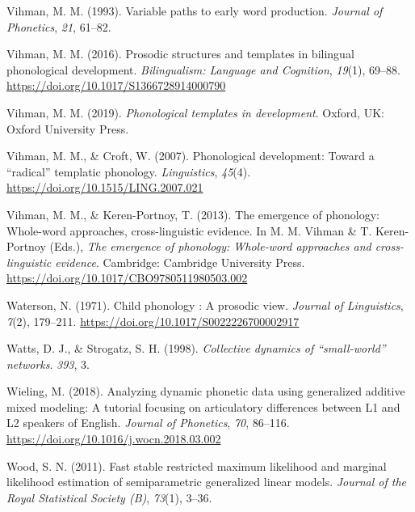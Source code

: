 \documentclass[
  man]{apa6}
\newlength{\cslhangindent}
\newenvironment{CSLReferences}[2] %
 {\begin{list}{}{%
  \setlength{\itemindent}{0pt}
  \setlength{\leftmargin}{0pt}
  \setlength{\parsep}{0pt}
  \ifodd #1
   \setlength{\leftmargin}{\cslhangindent}
   \setlength{\itemindent}{-1\cslhangindent}
  \fi
  \setlength{\itemsep}{#2\baselineskip}}}
 {\end{list}}
\begin{document}
\begin{CSLReferences}{1}{0}
Vihman, M. M. (1993). Variable paths to early word production. \emph{Journal of Phonetics}, \emph{21}, 61--82.

Vihman, M. M. (2016). Prosodic structures and templates in bilingual phonological development. \emph{Bilingualism: Language and Cognition}, \emph{19}(1), 69--88. \url{https://doi.org/10.1017/S1366728914000790}

Vihman, M. M. (2019). \emph{Phonological templates in development}. Oxford, {UK}: Oxford University Press.

Vihman, M. M., \& Croft, W. (2007). Phonological development: Toward a {``radical''} templatic phonology. \emph{Linguistics}, \emph{45}(4). \url{https://doi.org/10.1515/LING.2007.021}

Vihman, M. M., \& Keren-Portnoy, T. (2013). The emergence of phonology: Whole-word approaches, cross-linguistic evidence. In M. M. Vihman \& T. Keren-Portnoy (Eds.), \emph{The emergence of phonology: Whole-word approaches and cross-linguistic evidence}. Cambridge: Cambridge University Press. \url{https://doi.org/10.1017/CBO9780511980503.002}

Waterson, N. (1971). Child phonology : A prosodic view. \emph{Journal of Linguistics}, \emph{7}(2), 179--211. \url{https://doi.org/10.1017/S0022226700002917}

Watts, D. J., \& Strogatz, S. H. (1998). \emph{Collective dynamics of {``small-world''} networks}. \emph{393}, 3.

Wieling, M. (2018). Analyzing dynamic phonetic data using generalized additive mixed modeling: {A} tutorial focusing on articulatory differences between {L1} and {L2} speakers of {English}. \emph{Journal of Phonetics}, \emph{70}, 86--116. \url{https://doi.org/10.1016/j.wocn.2018.03.002}

Wood, S. N. (2011). Fast stable restricted maximum likelihood and marginal likelihood estimation of semiparametric generalized linear models. \emph{Journal of the Royal Statistical Society (B)}, \emph{73}(1), 3--36.

\end{CSLReferences}


\clearpage
\renewcommand{\listfigurename}{Figure captions}
\end{document}
